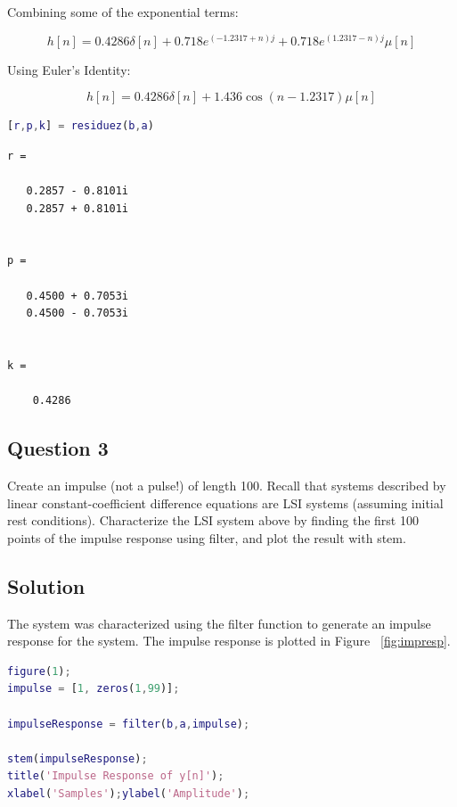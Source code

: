 \documentclass{article}
\begin{document}
\begin{par}
Combining some of the exponential terms:
\end{par} \vspace{1em}
\begin{par}
$$h[n] = 0.4286\delta[n] + 0.718e^{(-1.2317 + n)j} + 0.718e^{(1.2317 -
n)j}\mu[n]$$
\end{par} \vspace{1em}
\begin{par}
Using Euler's Identity:
\end{par} \vspace{1em}
\begin{par}
$$h[n] = 0.4286\delta[n] + 1.436\cos{(n - 1.2317)}\mu[n]$$
\end{par} \vspace{1em}
\begin{lstlisting}[language=matlab]
[r,p,k] = residuez(b,a)
\end{lstlisting}

        \color{lightgray} \begin{verbatim}
r =

   0.2857 - 0.8101i
   0.2857 + 0.8101i


p =

   0.4500 + 0.7053i
   0.4500 - 0.7053i


k =

    0.4286

\end{verbatim} \color{black}
    
\subsection*{Question 3}

\begin{par}
Create an impulse (not a pulse!) of length 100.  Recall that systems described by linear constant-coefficient difference equations are LSI systems (assuming initial rest conditions).  Characterize the LSI system above by finding the first 100 points of the impulse response using filter, and plot the result with stem.
\end{par} \vspace{1em}


\subsection*{Solution}

\begin{par}
The system was characterized using the filter function to generate an impulse response for the system.  The impulse response is plotted in Figure ~\ref{fig:impresp}.
\end{par} \vspace{1em}
\begin{lstlisting}[language=matlab]
figure(1);
impulse = [1, zeros(1,99)];

impulseResponse = filter(b,a,impulse);

stem(impulseResponse);
title('Impulse Response of y[n]');
xlabel('Samples');ylabel('Amplitude');
\end{lstlisting}
\end{document}
